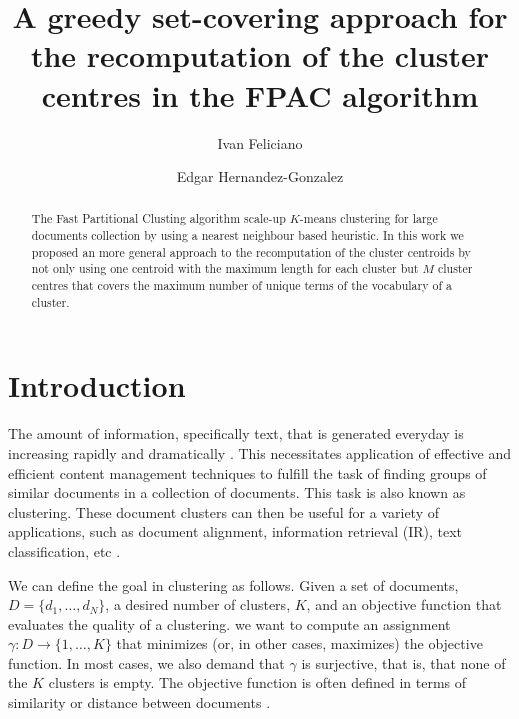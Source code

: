 \documentclass[runningheads]{llncs}
\begin{document}
%
\title{A greedy set-covering approach for the recomputation of the cluster centres in the FPAC algorithm}

\author{Ivan Feliciano \and
Edgar Hernandez-Gonzalez}
%
%
\maketitle              %
\begin{abstract}
The Fast Partitional Clusting algorithm scale-up
$K$-means clustering for large documents collection
by using a nearest neighbour based heuristic.
In this work we proposed an more general
approach to the recomputation of the cluster centroids 
by not only using one centroid with the maximum length for each cluster
but $M$ cluster centres that covers the maximum number
of unique terms of the vocabulary of a cluster.

\end{abstract}

\section{Introduction}


The amount of information, specifically text, that is generated everyday
is increasing rapidly and dramatically \cite{mehdi_assefi_saied_trippe_d._gutierrez_juan_krys_2017}. This necessitates application of effective and efficient content management techniques to fulfill the task of finding groups of similar documents in a collection of documents. This task is also known as 
clustering. These document clusters can then be useful for a variety
of applications, such as document alignment, information retrieval
(IR), text classification, etc \cite{ganguly_2018}.

We can define the goal in clustering as follows. 
Given a set of documents, $D = \{d_1 , \dots , d_N \}$,
a desired number of clusters, $K$,  and 
an objective function that evaluates the quality of a clustering.
we want to compute an assignment $\gamma : D \rightarrow \{1, \dots , K \}$ that minimizes (or, in other cases,
maximizes) the objective function. In most cases, we also demand that $\gamma$ is
surjective, that is, that none of the $K$ clusters is empty.
The objective function is often defined in terms of similarity or distance between documents \cite{manning_2009}.
\end{document}
